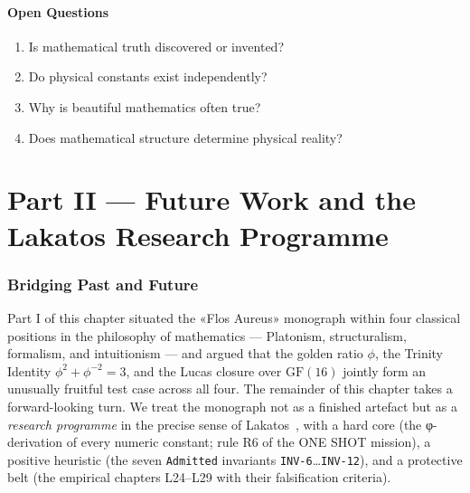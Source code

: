 \subsection*{Open Questions}

\begin{enumerate}
    \item Is mathematical truth discovered or invented?
    \item Do physical constants exist independently?
    \item Why is beautiful mathematics often true?
    \item Does mathematical structure determine physical reality?
\end{enumerate}


\part*{Part II — Future Work and the Lakatos Research Programme}

\section{Bridging Past and Future}
\label{sec:31-bridge}

Part I of this chapter situated the «Flos Aureus» monograph within four classical positions in the philosophy of mathematics — Platonism, structuralism, formalism, and intuitionism — and argued that the golden ratio $\phi$, the Trinity Identity $\phi^{2} + \phi^{-2} = 3$, and the Lucas closure over $\mathrm{GF}(16)$ jointly form an unusually fruitful test case across all four. The remainder of this chapter takes a forward-looking turn. We treat the monograph not as a finished artefact but as a \emph{research programme} in the precise sense of Lakatos~\cite{cox_golden_ratio}, with a hard core (the φ-derivation of every numeric constant; rule R6 of the ONE SHOT mission), a positive heuristic (the seven \texttt{Admitted} invariants \texttt{INV-6}…\texttt{INV-12}), and a protective belt (the empirical chapters L24–L29 with their falsification criteria).

